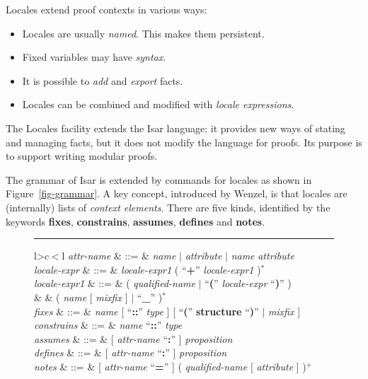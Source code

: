 \begin{isabellebody}
\begin{isamarkuptext}
  Locales extend proof contexts in various ways:
  \begin{itemize}
  \item
    Locales are usually \emph{named}.  This makes them persistent.
  \item
    Fixed variables may have \emph{syntax}.
  \item
    It is possible to \emph{add} and \emph{export} facts.
  \item
    Locales can be combined and modified with \emph{locale
    expressions}.
  \end{itemize}
  The Locales facility extends the Isar language: it provides new ways
  of stating and managing facts, but it does not modify the language
  for proofs.  Its purpose is to support writing modular proofs.%
\end{isamarkuptext}%
\isamarkuptrue%
%
\isamarkuptrue%
%
\isamarkuptrue%
%
\begin{isamarkuptext}%
The grammar of Isar is extended by commands for locales as shown in
  Figure~\ref{fig-grammar}.
  A key concept, introduced by Wenzel, is that
  locales are (internally) lists
  of \emph{context elements}.  There are five kinds, identified
  by the keywords \textbf{fixes}, \textbf{constrains},
  \textbf{assumes}, \textbf{defines} and \textbf{notes}.

  \begin{figure}
  \hrule
  \vspace{2ex}
  \begin{small}
  \begin{tabular}{l>$c<$l}
  \textit{attr-name} & ::=
  & \textit{name} $|$ \textit{attribute} $|$
    \textit{name} \textit{attribute} \\

  \textit{locale-expr}  & ::= 
  & \textit{locale-expr1} ( ``\textbf{+}'' \textit{locale-expr1} )$^*$ \\
  \textit{locale-expr1} & ::=
  & ( \textit{qualified-name} $|$
    ``\textbf{(}'' \textit{locale-expr} ``\textbf{)}'' ) \\
  & & ( \textit{name} [ \textit{mixfix} ] $|$ ``\textbf{\_}'' )$^*$ \\

  \textit{fixes} & ::=
  & \textit{name} [ ``\textbf{::}'' \textit{type} ]
    [ ``\textbf{(}'' \textbf{structure} ``\textbf{)}'' $|$
    \textit{mixfix} ] \\
  \textit{constrains} & ::=
  & \textit{name} ``\textbf{::}'' \textit{type} \\
  \textit{assumes} & ::=
  & [ \textit{attr-name} ``\textbf{:}'' ] \textit{proposition} \\
  \textit{defines} & ::=
  & [ \textit{attr-name} ``\textbf{:}'' ] \textit{proposition} \\
  \textit{notes} & ::=
  & [ \textit{attr-name} ``\textbf{=}'' ]
    ( \textit{qualified-name} [ \textit{attribute} ] )$^+$ \\


\end{tabular}
\end{small}
\end{figure}
\end{isamarkuptext}
\end{isabellebody}
